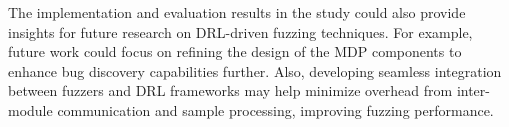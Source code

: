 \documentclass[lettersize,journal]{IEEEtran}
\begin{document}
The implementation and evaluation results in the study could also provide insights for future research on DRL-driven fuzzing techniques. For example, future work could focus on refining the design of the MDP components to enhance bug discovery capabilities further. Also, developing seamless integration between fuzzers and DRL frameworks may help minimize overhead from inter-module communication and sample processing, improving fuzzing performance.







\vfill
\end{document}
